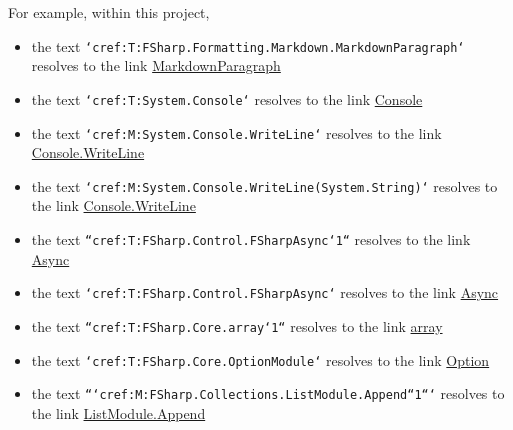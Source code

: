 \documentclass{article}
\begin{document}
For example, within this project,
\begin{itemize}
\item 

the text \texttt{`cref:T:FSharp.Formatting.Markdown.MarkdownParagraph`} resolves to the link \href{https://fsprojects.github.io/FSharp.Formatting/reference/fsharp-formatting-markdown-markdownparagraph.html}{MarkdownParagraph}

\item 

the text \texttt{`cref:T:System.Console`} resolves to the link \href{https://learn.microsoft.com/dotnet/api/system.console}{Console}

\item 

the text \texttt{`cref:M:System.Console.WriteLine`} resolves to the link \href{https://learn.microsoft.com/dotnet/api/system.console.writeline}{Console.WriteLine}

\item 

the text \texttt{`cref:M:System.Console.WriteLine(System.String)`} resolves to the link \href{https://learn.microsoft.com/dotnet/api/system.console.writeline}{Console.WriteLine}

\item 

the text \texttt{``cref:T:FSharp.Control.FSharpAsync`1``} resolves to the link \href{https://fsharp.github.io/fsharp-core-docs/reference/fsharp-control-fsharpasync-1}{Async}

\item 

the text \texttt{`cref:T:FSharp.Control.FSharpAsync`} resolves to the link \href{https://fsharp.github.io/fsharp-core-docs/reference/fsharp-control-fsharpasync}{Async}

\item 

the text \texttt{``cref:T:FSharp.Core.array`1``} resolves to the link \href{https://fsharp.github.io/fsharp-core-docs/reference/fsharp-core-array-1}{array}

\item 

the text \texttt{`cref:T:FSharp.Core.OptionModule`} resolves to the link \href{https://fsharp.github.io/fsharp-core-docs/reference/fsharp-core-optionmodule}{Option}

\item 

the text \texttt{```cref:M:FSharp.Collections.ListModule.Append``1```} resolves to the link \href{https://fsharp.github.io/fsharp-core-docs/reference/fsharp-collections-listmodule\#Append}{ListModule.Append}

\end{itemize}
\end{document}
